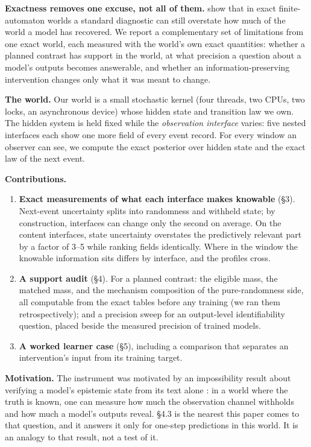 \documentclass[10pt]{article}
\providecommand{\tightlist}{\setlength{\itemsep}{0pt}\setlength{\parskip}{0pt}}
\begin{document}
\textbf{Exactness removes one excuse, not all of them.} \citet{vafa2024world} show that in exact finite-automaton worlds a standard
diagnostic can still overstate how much of the world a model has recovered. We report a complementary set of
limitations from one exact world, each measured with the world's own exact quantities: whether a planned contrast has
support in the world, at what precision a question about a model's outputs becomes answerable, and whether an
information-preserving intervention changes only what it was meant to change.

\textbf{The world.} Our world is a small stochastic kernel (four threads, two CPUs, two locks, an asynchronous device) whose
hidden state and transition law we own. The hidden system is held fixed while the \emph{observation interface} varies: five
nested interfaces each show one more field of every event record. For every window an observer can see, we compute
the exact posterior over hidden state and the exact law of the next event.

\textbf{Contributions.}

\begin{enumerate}
\def\labelenumi{\arabic{enumi}.}
\tightlist
\item
  \textbf{Exact measurements of what each interface makes knowable} (§3). Next-event uncertainty splits into randomness and
  withheld state; by construction, interfaces can change only the second on average. On the content interfaces, state uncertainty
  overstates the predictively relevant part by a factor of 3--5 while ranking fields identically. Where in the window
  the knowable information sits differs by interface, and the profiles cross.
\item
  \textbf{A support audit} (§4). For a planned contrast: the eligible mass, the matched mass, and the mechanism
  composition of the pure-randomness side, all computable from the exact tables before any training (we ran them retrospectively); and a
  precision sweep for an output-level identifiability question, placed beside the measured precision of trained
  models.
\item
  \textbf{A worked learner case} (§5), including a comparison that separates an intervention's input from its training
  target.
\end{enumerate}

\textbf{Motivation.} The instrument was motivated by an impossibility result about verifying a model's epistemic state from
its text alone \citep{epistemic2026observability}: in a world where the truth is known, one can measure how much the observation
channel withholds and how much a model's outputs reveal. §4.3 is the nearest this paper comes to that question, and it
answers it only for one-step predictions in this world. It is an analogy to that result, not a test of it.
\end{document}
